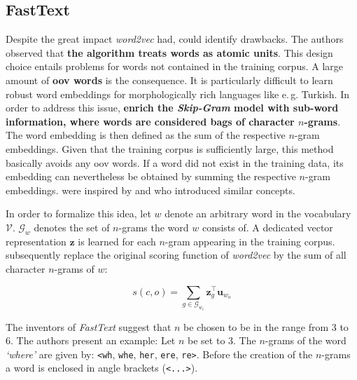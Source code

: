 \subsection{FastText}
\label{sec:fasttext}

Despite the great impact \textit{word2vec} had, \citep{Bojanowski.2017} could identify drawbacks. The authors observed that \textbf{the algorithm treats words as atomic units}. This design choice entails problems for words not contained in the training corpus. A large amount of \textbf{\gls{oov} words} is the consequence. It is particularly difficult to learn robust word embeddings for morphologically rich languages like e.\,g. Turkish. In order to address this issue, \citep{Bojanowski.2017} \textbf{enrich the \textit{Skip-Gram} model with sub-word information, where words are considered bags of character $n$-grams}. The word embedding is then defined as the sum of the respective $n$-gram embeddings. Given that the training corpus is sufficiently large, this method basically avoids any \gls{oov} words. If a word did not exist in the training data, its embedding can nevertheless be obtained by summing the respective $n$-gram embeddings. \citep{Bojanowski.2017} were inspired by \citep{Schuetze.1993} and \citep{Wieting.2016a} who introduced similar concepts.

In order to formalize this idea, let $w$ denote an arbitrary word in the vocabulary $\mathcal{V}$. $\mathcal{G}_w$ denotes the set of $n$-grams the word $w$ consists of. A dedicated vector representation $\bm{z}$ is learned for each $n$-gram appearing in the training corpus. \citep{Bojanowski.2017} subsequently replace the original scoring function of \textit{word2vec} by the sum of all character $n$-grams of $w$:

\begin{equation}
	s(c, o) = \sum_{g \in \mathcal{G}_{w_c}} \bm{z}_g^{\intercal} \bm{u}_{w_o}
\end{equation}

The inventors of \textit{FastText} suggest that $n$ be chosen to be in the range from 3 to 6. The authors present an example: Let $n$ be set to 3. The $n$-grams of the word \textit{`where'} are given by: \texttt{<wh}, \texttt{whe}, \texttt{her}, \texttt{ere}, \texttt{re>}. Before the creation of the $n$-grams a word is enclosed in angle brackets (\texttt{<...>}).

